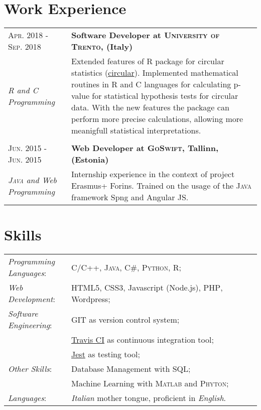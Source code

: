\documentclass[a4paper,10pt]{article}
\begin{document}
\section{Work Experience}
\begin{tabular}{m{0.25\linewidth}|p{0.75\linewidth}}
  \textsc{Apr. 2018 - Sep. 2018} &
    \textbf{Software Developer at \textsc{University of Trento}, (Italy)} \\
    \emph{R and C Programming} &
    Extended features of R package for circular statistics (\href{https://r-forge.r-project.org/projects/circular/}{circular}). Implemented mathematical routines in R and C languages for calculating p-value for statistical hypothesis tests for circular data. With the new features the package can perform more precise calculations, allowing more meanigfull statistical interpretations.
    \\
  \multicolumn{2}{c}{} \\
  \textsc{Jun. 2015 - Jun. 2015} &
  \textbf{Web Developer at \textsc{GoSwift}, Tallinn, (Estonia)}\\
  \emph{\textsc{Java} and Web Programming} &
  Internship experience in the context of project Erasmus+ Forins. Trained on the usage of the \textsc{Java} framework Spng and Angular JS.
\end{tabular}

\section{Skills}
\begin{tabular}{m{0.25\linewidth} p{0.75\linewidth}}
\emph{Programming Languages}: & \textsc{C/C++, Java, C\#, Python, R};\\
\emph{Web Development}:       & HTML5, CSS3, Javascript (Node.js), \textsc{PHP}, Wordpress;\\
\emph{Software Engineering}: &\textsc{GIT} as version control system;\\
                     &\href{https://travis-ci.com/}{Travis CI} as continuous integration tool;\\ 
                     &\href{https://jestjs.io/en/}{Jest} as testing tool;\\
\emph{Other Skills}:         & Database Management with \textsc{SQL};\\
                     & Machine Learning with \textsc{Matlab} and \textsc{Phyton};\\
\emph{Languages}:            & \emph{Italian} mother tongue, proficient in \emph{English}.\\

\end{tabular}
\end{document}
